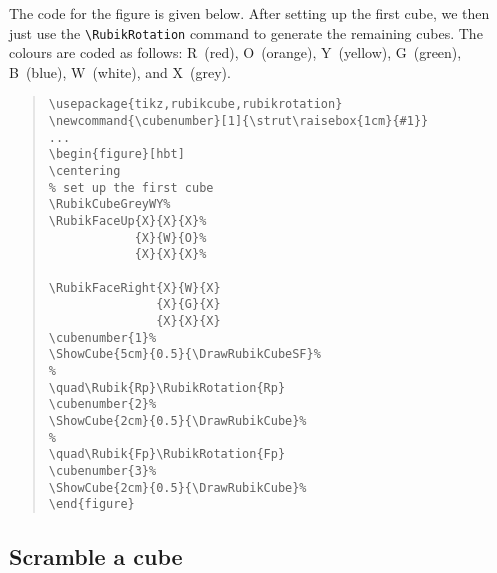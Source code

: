 \documentclass[a4paper]{article}
\newcommand{\cubenumber}[1]{\strut\raisebox{1cm}{#1}}
\begin{document}
{\noindent}The code for the figure is given below. 
After setting up the first cube, we then just use the \verb!\RubikRotation! 
command to generate the  remaining cubes.
The colours are coded as follows:  R~(red), O~(orange), Y~(yellow), 
G~(green), B~(blue),  W~(white),  and   X~(grey).

\begin{quote}
\begin{verbatim}
\usepackage{tikz,rubikcube,rubikrotation}
\newcommand{\cubenumber}[1]{\strut\raisebox{1cm}{#1}}
...
\begin{figure}[hbt]
\centering
% set up the first cube
\RubikCubeGreyWY%
\RubikFaceUp{X}{X}{X}%
            {X}{W}{O}%
            {X}{X}{X}%

\RubikFaceRight{X}{W}{X}
               {X}{G}{X}
               {X}{X}{X}
\cubenumber{1}%
\ShowCube{5cm}{0.5}{\DrawRubikCubeSF}%
%
\quad\Rubik{Rp}\RubikRotation{Rp}
\cubenumber{2}%
\ShowCube{2cm}{0.5}{\DrawRubikCube}%
%
\quad\Rubik{Fp}\RubikRotation{Fp}
\cubenumber{3}%
\ShowCube{2cm}{0.5}{\DrawRubikCube}%
\end{figure} 
\end{verbatim}
\end{quote}


\pagebreak

\subsection{Scramble a cube}
\label{sec:scrambleacube}
\end{document}
